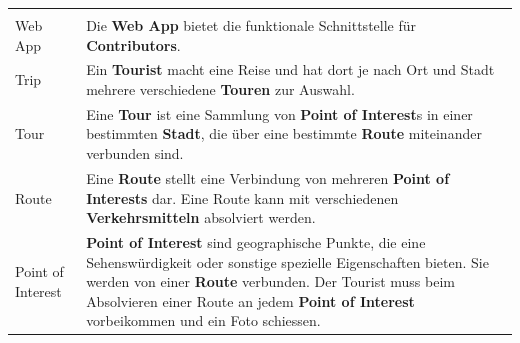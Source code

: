 \documentclass[a4paper,10pt,xetex]{article}
\begin{document}
\begin{longtable}[]{@{}ll@{}}
\begin{minipage}[t]{0.86\columnwidth}
\end{minipage}\tabularnewline
\begin{minipage}[t]{0.08\columnwidth}\raggedright\strut
Web App\strut
\end{minipage} & \begin{minipage}[t]{0.86\columnwidth}\raggedright\strut
Die \textbf{Web App} bietet die funktionale Schnittstelle für
\textbf{Contributors}.\strut
\end{minipage}\tabularnewline
\begin{minipage}[t]{0.08\columnwidth}\raggedright\strut
Trip\strut
\end{minipage} & \begin{minipage}[t]{0.86\columnwidth}\raggedright\strut
Ein \textbf{Tourist} macht eine Reise und hat dort je nach Ort und Stadt
mehrere verschiedene \textbf{Touren} zur Auswahl.\strut
\end{minipage}\tabularnewline
\begin{minipage}[t]{0.08\columnwidth}\raggedright\strut
Tour\strut
\end{minipage} & \begin{minipage}[t]{0.86\columnwidth}\raggedright\strut
Eine \textbf{Tour} ist eine Sammlung von \textbf{Point of Interest}s in
einer bestimmten \textbf{Stadt}, die über eine bestimmte \textbf{Route}
miteinander verbunden sind.\strut
\end{minipage}\tabularnewline
\begin{minipage}[t]{0.08\columnwidth}\raggedright\strut
Route\strut
\end{minipage} & \begin{minipage}[t]{0.86\columnwidth}\raggedright\strut
Eine \textbf{Route} stellt eine Verbindung von mehreren \textbf{Point of
Interests} dar. Eine Route kann mit verschiedenen
\textbf{Verkehrsmitteln} absolviert werden.\strut
\end{minipage}\tabularnewline
\begin{minipage}[t]{0.08\columnwidth}\raggedright\strut
Point of Interest\strut
\end{minipage} & \begin{minipage}[t]{0.86\columnwidth}\raggedright\strut
\textbf{Point of Interest} sind geographische Punkte, die eine
Sehenswürdigkeit oder sonstige spezielle Eigenschaften bieten. Sie
werden von einer \textbf{Route} verbunden. Der Tourist muss beim
Absolvieren einer Route an jedem \textbf{Point of Interest} vorbeikommen
und ein Foto schiessen.\strut
\end{minipage}\tabularnewline

\end{longtable}
\end{document}
